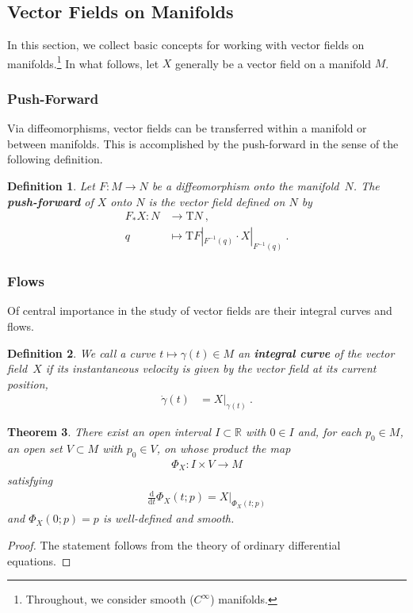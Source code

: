 \documentclass[10pt,a4paper]{article}
\theoremstyle{mytheorem}
\newtheorem{theorem}{Theorem}[section]
\theoremstyle{mydefinition}
\newtheorem{definition}[theorem]{Definition}
\newcommand{\mydef}[1]{\textbf{\textit{#1}}}
\newcommand{\dt}{\mathrm{d}}
\newcommand{\Tt}{\mathrm{T}}
\begin{document}
\subsection{Vector Fields on Manifolds}

In this section, we collect basic concepts for working with vector fields on manifolds.\footnote{
	Throughout, we consider smooth ($C^\infty$) manifolds.
}
In what follows, let $X$ generally be a vector field on a manifold $M$.

\subsubsection{Push-Forward}

Via diffeomorphisms, vector fields can be transferred within a manifold or between manifolds.
This is accomplished by the push-forward in the sense of the following definition.
\begin{definition}
Let $F:M\rightarrow N$ be a diffeomorphism onto the manifold~$N$.
The \mydef{push-forward} of $X$ onto $N$ is the vector field defined on $N$ by
\begin{align*}
	F_*X: N &\rightarrow \Tt N
	\ ,\nonumber\\
	q &\mapsto \Tt F|_{F^{-1}(q)}\cdot X|_{F^{-1}(q)}
	\ .
\end{align*}
\end{definition}

\subsubsection{Flows}

Of central importance in the study of vector fields are their integral curves and flows.
\begin{definition}
We call a curve $t\mapsto\gamma(t)\in M$ an \mydef{integral curve} of the vector field~$X$ if its instantaneous velocity is given by the vector field at its current position,
\begin{align*}
	\dot{\gamma}(t) &= X|_{\gamma(t)}
	\ .
\end{align*}
\end{definition}

\begin{theorem}
There exist an open interval $I\subset\mathbb{R}$ with $0\in I$ and, for each $p_0\in M$, an open set $V\subset M$ with $p_0\in V$, on whose product the map
\begin{align*}
	\Phi_X: I\times V \rightarrow M
\end{align*}
satisfying
\begin{align*}
	\frac{\dt}{\dt t}\Phi_X(t; p) = X|_{\Phi_X(t; p)}
\end{align*}
and $\Phi_X(0; p)=p$ is well-defined and smooth.
\end{theorem}
\begin{proof}
The statement follows from the theory of ordinary differential equations.
\end{proof}
\end{document}
